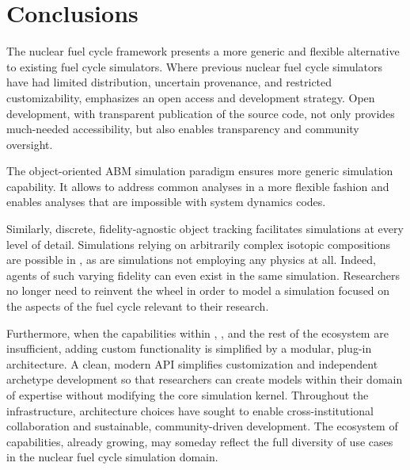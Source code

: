 

\section{Conclusions}


The \Cyclus nuclear fuel cycle framework presents a more generic and flexible 
alternative to existing fuel cycle simulators. Where previous nuclear fuel cycle simulators have had limited distribution, 
uncertain provenance, and restricted customizability, \Cyclus emphasizes an 
open access and development strategy.  Open development, with transparent 
publication of the source code, not only provides much-needed accessibility, 
but also enables transparency and community oversight. 

The object-oriented \gls{ABM} simulation paradigm ensures more generic 
simulation capability. It allows \Cyclus to address common analyses in a more 
flexible fashion and enables analyses that are impossible with system dynamics 
codes. 

Similarly, discrete, fidelity-agnostic object tracking facilitates simulations 
at every level of detail. Simulations relying on arbitrarily complex isotopic 
compositions are possible in \Cyclus, as are simulations not employing any 
physics at all. Indeed, agents of such varying fidelity can even exist in the 
same simulation. Researchers no longer need to reinvent the wheel in order to 
model a simulation focused on the aspects of the fuel cycle
relevant to their research.

Furthermore, when the capabilities within \Cyclus, \Cycamore, and the rest of 
the ecosystem are insufficient, adding custom functionality is simplified by a 
modular, plug-in architecture. A clean, modern \gls{API} simplifies 
customization and independent archetype development so that researchers can 
create models within their domain of expertise without modifying the core 
simulation kernel. Throughout the \Cyclus 
infrastructure, architecture choices have sought to enable cross-institutional 
collaboration and sustainable, community-driven development. The ecosystem 
of capabilities, already growing, may someday reflect the full diversity of use 
cases in the nuclear fuel cycle simulation domain.



